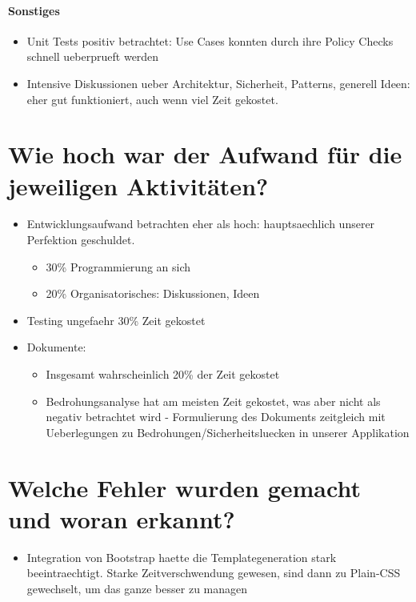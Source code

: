 \documentclass[12pt,DIV14,BCOR10mm,a4paper,parskip=half-,headsepline,headinclude,english,ngerman,bibliography=totocnumbered]{scrreprt}
\begin{document}
\paragraph{Sonstiges}
\begin{itemize}
  \item Unit Tests positiv betrachtet: Use Cases konnten durch ihre Policy Checks schnell ueberprueft werden
  \item Intensive Diskussionen ueber Architektur, Sicherheit, Patterns, generell Ideen: eher gut funktioniert, auch wenn viel Zeit gekostet.
\end{itemize}

\section{Wie hoch war der Aufwand für die jeweiligen Aktivitäten?}

\begin{itemize}
  \item Entwicklungsaufwand betrachten eher als hoch: hauptsaechlich unserer Perfektion geschuldet.
  \begin{itemize}
    \item 30\% Programmierung an sich
    \item 20\% Organisatorisches: Diskussionen, Ideen
  \end{itemize}
  \item Testing ungefaehr 30\% Zeit gekostet
  \item Dokumente:
  \begin{itemize}
    \item Insgesamt wahrscheinlich 20\% der Zeit gekostet
    \item Bedrohungsanalyse hat am meisten Zeit gekostet, was aber nicht als negativ betrachtet wird - Formulierung des Dokuments zeitgleich mit Ueberlegungen zu Bedrohungen/Sicherheitsluecken in unserer Applikation
  \end{itemize}
\end{itemize}

\section{Welche Fehler wurden gemacht und woran erkannt?}

\begin{itemize}
  \item Integration von Bootstrap haette die Templategeneration stark beeintraechtigt. Starke Zeitverschwendung gewesen, sind dann zu Plain-CSS gewechselt, um das ganze besser zu managen
\end{itemize}
\end{document}
